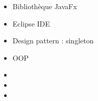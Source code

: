 \documentclass{article}
\begin{document}
\begin{tabular}
\begin{itemize}
\begin{itemize}
            \item \textcolor{gray!100}{Bibliothèque JavaFx}
            \item \textcolor{gray!100}{Eclipse IDE}
            \item \textcolor{gray!100}{Design pattern : singleton }
            \item \textcolor{gray!100}{OOP}
            \item[\textcolor{white}{}] {} %
            \item[\textcolor{white}{}] {} %
            \item[\textcolor{white}{}] {} %
     
        \end{itemize}
    \end{itemize}
\end{tabular}




\begin{center}
\end{center}
\end{document}
